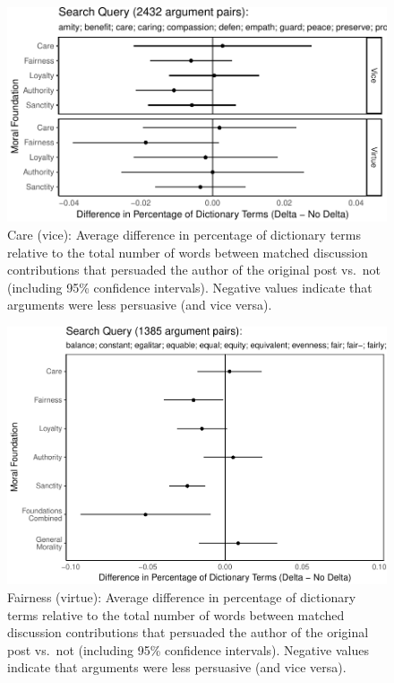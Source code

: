 \documentclass[12pt,]{article}
\begin{document}
\begin{figure}
\centering
\includegraphics{prelim_files/figure-latex/harm vice-1.pdf}
\caption{Care (vice): Average difference in percentage of dictionary
terms relative to the total number of words between matched discussion
contributions that persuaded the author of the original post vs.~not
(including 95\% confidence intervals). Negative values indicate that
arguments were less persuasive (and vice versa).}
\end{figure}

\begin{figure}
\centering
\includegraphics{prelim_files/figure-latex/fairness virtue-1.pdf}
\caption{Fairness (virtue): Average difference in percentage of
dictionary terms relative to the total number of words between matched
discussion contributions that persuaded the author of the original post
vs.~not (including 95\% confidence intervals). Negative values indicate
that arguments were less persuasive (and vice versa).}
\end{figure}
\end{document}
